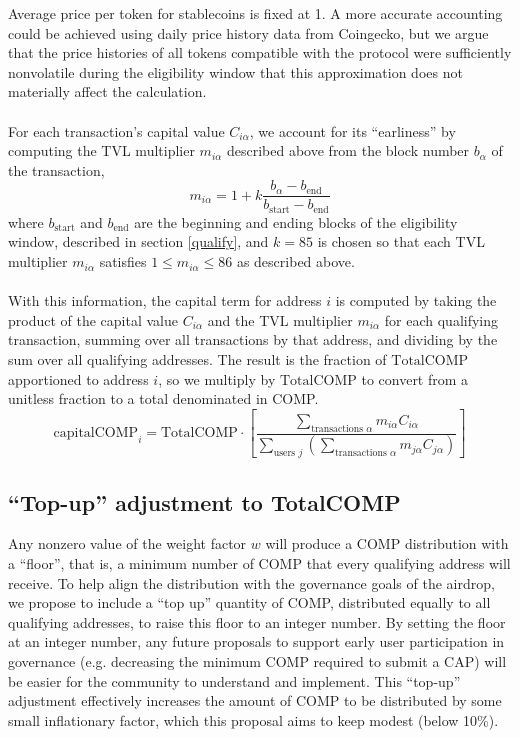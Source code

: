 \documentclass[12pt]{article}
\begin{document}
Average price per token for stablecoins is fixed at 1. 
A more accurate accounting could be achieved using daily price history data from Coingecko,
but we argue that the price histories of all tokens compatible with the protocol were
sufficiently nonvolatile during the eligibility window that this approximation does not
materially affect the calculation.
\\\\
For each transaction's capital value $C_{i\alpha}$, we account for its ``earliness'' by
computing the TVL multiplier $m_{i\alpha}$ described above from the block number $b_{\alpha}$ of the transaction,
\begin{equation*}
  m_{i\alpha} = 1 + k\frac{b_{\alpha} - b_{\textrm{end}}}
                     {b_{\textrm{start}}-b_{\textrm{end}}}
\end{equation*}
where $b_{\textrm{start}}$ and $b_{\textrm{end}}$ are the beginning and ending blocks of the
eligibility window, described in section \ref{qualify}, and $k=85$ is chosen so that each TVL
multiplier $m_{i\alpha}$ satisfies $1 \leq m_{i\alpha} \leq 86$ as described above.
\\\\
With this information, the capital term for address $i$ is computed by taking the product
of the capital value $C_{i\alpha}$ and the TVL multiplier $m_{i\alpha}$ for each qualifying
transaction, summing over all transactions by that address, and dividing by the sum over all
qualifying addresses. The result is the fraction of $\textrm{TotalCOMP}$ 
apportioned to address $i$, so we multiply by $\textrm{TotalCOMP}$ to convert from a unitless
fraction to a total denominated in COMP.
\begin{equation*}
  \mathrm{capitalCOMP}_i = \textrm{TotalCOMP}\cdot\left[\frac{\sum\limits_{\textrm{transactions }\alpha}{m_{i\alpha}C_{i\alpha}}}{\sum\limits_{\textrm{users }j}\left({\sum\limits_{\textrm{transactions }\alpha}{m_{j\alpha}C_{j\alpha}}}\right)}\right]
\end{equation*}

\subsection{``Top-up'' adjustment to \textrm{TotalCOMP}}

Any nonzero value of the weight factor $w$ will produce a COMP distribution with a ``floor'',
that is, a minimum number of COMP that every qualifying address will receive.
To help align the distribution with the governance goals of the airdrop,
we propose to include a ``top up'' quantity of COMP, distributed equally to all qualifying
addresses, to raise this floor to an integer number. By setting the floor at an integer 
number, any future proposals to support early user participation in governance
(e.g. decreasing the minimum COMP required to submit a CAP) will be easier for the
community to understand and implement. This ``top-up'' adjustment effectively
increases the amount of COMP to be distributed by some small inflationary factor,
which this proposal aims to keep modest (below 10\%).
\end{document}
